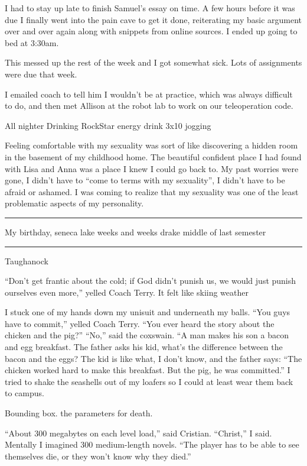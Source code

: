 I had to stay up late to finish Samuel's essay on time.  A few hours before it
was due I finally went into the pain cave to get it done, reiterating my basic
argument over and over again along with snippets from online sources.  I ended
up going to bed at 3:30am.

This messed up the rest of the week and I got somewhat sick.  Lots of
assignments were due that week.

I emailed coach to tell him I wouldn't be at practice, which was always
difficult to do, and then met Allison at the robot lab to work on our
teleoperation code.

All nighter
Drinking RockStar energy drink
3x10
jogging

Feeling comfortable with my sexuality was sort of like discovering a hidden room
in the basement of my childhood home.  The beautiful confident place I had found
with Lisa and Anna was a place I knew I could go back to.  My past worries were
gone, I didn't have to ``come to terms with my sexuality'', I didn't have to be
afraid or ashamed.  I was coming to realize that my sexuality was one of the
least problematic aspects of my personality.


\plainfancybreak{12pt}{2}{* * *}

My birthday, seneca lake
weeks and weeks
drake
middle of last semester

\plainfancybreak{12pt}{2}{* * *}

Taughanock 

``Don't get frantic about the cold; if God didn't punish us, we would just
punish ourselves even more,'' yelled Coach Terry.  It felt like skiing weather

I stuck one of my hands down my unisuit and underneath my balls.  ``You guys
have to commit,'' yelled Coach Terry.  ``You ever heard the story about the
chicken and the pig?'' ``No,'' said the coxswain.  ``A man makes his son a bacon
and egg breakfast.  The father asks his kid, what's the difference between the
bacon and the eggs?  The kid is like what, I don't know, and the father says:
``The chicken worked hard to make this breakfast.  But the pig, he was
committed.'' I tried to shake the seashells out of my loafers so I could at
least wear them back to campus. 

Bounding box.  the parameters for death.

``About 300 megabytes on each level load,'' said Cristian.  ``Christ,'' I said.
Mentally I imagined 300 medium-length novels.  ``The player has to be able to
see themselves die, or they won't know why they died.'' 

